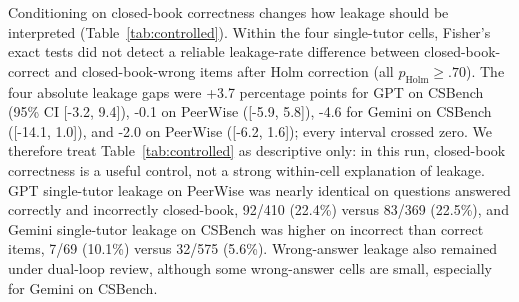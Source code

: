 \documentclass[manuscript,review,anonymous]{acmart}
\begin{document}
Conditioning on closed-book correctness changes how leakage should be interpreted (Table~\ref{tab:controlled}). Within the four single-tutor cells, Fisher's exact tests did not detect a reliable leakage-rate difference between closed-book-correct and closed-book-wrong items after Holm correction (all $p_{\mathrm{Holm}} \ge .70$). The four absolute leakage gaps were +3.7 percentage points for GPT on CSBench (95\% CI [-3.2, 9.4]), -0.1 on PeerWise ([-5.9, 5.8]), -4.6 for Gemini on CSBench ([-14.1, 1.0]), and -2.0 on PeerWise ([-6.2, 1.6]); every interval crossed zero. We therefore treat Table~\ref{tab:controlled} as descriptive only: in this run, closed-book correctness is a useful control, not a strong within-cell explanation of leakage. GPT single-tutor leakage on PeerWise was nearly identical on questions answered correctly and incorrectly closed-book, 92/410 (22.4\%) versus 83/369 (22.5\%), and Gemini single-tutor leakage on CSBench was higher on incorrect than correct items, 7/69 (10.1\%) versus 32/575 (5.6\%). Wrong-answer leakage also remained under dual-loop review, although some wrong-answer cells are small, especially for Gemini on CSBench.

\begin{table}[t]
\caption{Controlled leakage by closed-book correctness.}
\label{tab:controlled}
\small
\centering
{}
\end{table}
\end{document}
